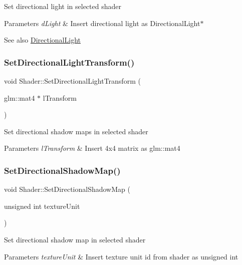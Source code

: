 Set directional light in selected shader 
\begin{DoxyParams}{Parameters}
{\em d\+Light} & Insert directional light as Directional\+Light$\ast$ \\
\hline
\end{DoxyParams}
\begin{DoxySeeAlso}{See also}
\mbox{\hyperlink{class_directional_light}{Directional\+Light}} 
\end{DoxySeeAlso}
\mbox{\label{class_shader_a50df005f96c254f6e65642a1d51c4a28}} 
\subsubsection{\texorpdfstring{SetDirectionalLightTransform()}{SetDirectionalLightTransform()}}
{\footnotesize\ttfamily void Shader\+::\+Set\+Directional\+Light\+Transform (\begin{DoxyParamCaption}\item[{glm\+::mat4 $\ast$}]{l\+Transform }\end{DoxyParamCaption})}

Set directional shadow maps in selected shader 
\begin{DoxyParams}{Parameters}
{\em l\+Transform} & Insert 4x4 matrix as glm\+::mat4 \\
\hline
\end{DoxyParams}
\mbox{\label{class_shader_a57bd9a786383c5138c1d6497a689dd14}} 
\subsubsection{\texorpdfstring{SetDirectionalShadowMap()}{SetDirectionalShadowMap()}}
{\footnotesize\ttfamily void Shader\+::\+Set\+Directional\+Shadow\+Map (\begin{DoxyParamCaption}\item[{unsigned int}]{texture\+Unit }\end{DoxyParamCaption})}

Set directional shadow map in selected shader 
\begin{DoxyParams}{Parameters}
{\em texture\+Unit} & Insert texture unit id from shader as unsigned int \\
\hline
\end{DoxyParams}
\mbox{\label{class_shader_aa7ec944e22ea137fe404db211ca93c49}} 
